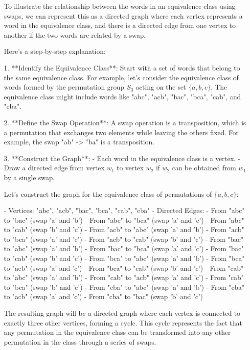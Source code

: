 To illustrate the relationship between the words in an equivalence class using swaps, we can represent this as a directed graph where each vertex represents a word in the equivalence class, and there is a directed edge from one vertex to another if the two words are related by a swap.

Here's a step-by-step explanation:

1. **Identify the Equivalence Class**: Start with a set of words that belong to the same equivalence class. For example, let's consider the equivalence class of words formed by the permutation group \( S_3 \) acting on the set \(\{a, b, c\}\). The equivalence class might include words like "abc", "acb", "bac", "bca", "cab", and "cba".

2. **Define the Swap Operation**: A swap operation is a transposition, which is a permutation that exchanges two elements while leaving the others fixed. For example, the swap "ab" -> "ba" is a transposition.

3. **Construct the Graph**:
   - Each word in the equivalence class is a vertex.
   - Draw a directed edge from vertex \( w_1 \) to vertex \( w_2 \) if \( w_2 \) can be obtained from \( w_1 \) by a single swap.

Let's construct the graph for the equivalence class of permutations of \(\{a, b, c\}\):

- Vertices: "abc", "acb", "bac", "bca", "cab", "cba"
- Directed Edges:
  - From "abc" to "bac" (swap 'a' and 'b')
  - From "abc" to "bca" (swap 'a' and 'c')
  - From "abc" to "cab" (swap 'b' and 'c')
  - From "acb" to "abc" (swap 'a' and 'b')
  - From "acb" to "bca" (swap 'a' and 'c')
  - From "acb" to "cab" (swap 'b' and 'c')
  - From "bac" to "abc" (swap 'a' and 'b')
  - From "bac" to "bca" (swap 'a' and 'c')
  - From "bac" to "cab" (swap 'b' and 'c')
  - From "bca" to "abc" (swap 'a' and 'b')
  - From "bca" to "acb" (swap 'a' and 'c')
  - From "bca" to "cab" (swap 'b' and 'c')
  - From "cab" to "abc" (swap 'a' and 'b')
  - From "cab" to "acb" (swap 'a' and 'c')
  - From "cab" to "bca" (swap 'b' and 'c')
  - From "cba" to "abc" (swap 'a' and 'b')
  - From "cba" to "acb" (swap 'a' and 'c')
  - From "cba" to "bac" (swap 'b' and 'c')

The resulting graph will be a directed graph where each vertex is connected to exactly three other vertices, forming a cycle. This cycle represents the fact that any permutation in the equivalence class can be transformed into any other permutation in the class through a series of swaps.

